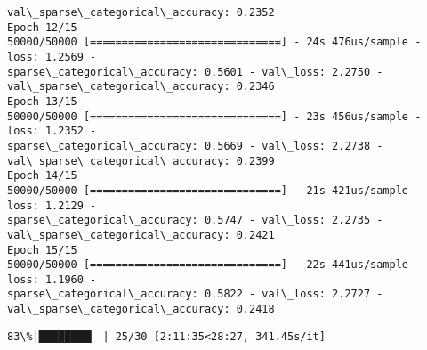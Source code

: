 \documentclass[11pt]{article}
\begin{document}
\begin{Verbatim}[commandchars=\\\{\}]
val\_sparse\_categorical\_accuracy: 0.2352
Epoch 12/15
50000/50000 [==============================] - 24s 476us/sample - loss: 1.2569 -
sparse\_categorical\_accuracy: 0.5601 - val\_loss: 2.2750 -
val\_sparse\_categorical\_accuracy: 0.2346
Epoch 13/15
50000/50000 [==============================] - 23s 456us/sample - loss: 1.2352 -
sparse\_categorical\_accuracy: 0.5669 - val\_loss: 2.2738 -
val\_sparse\_categorical\_accuracy: 0.2399
Epoch 14/15
50000/50000 [==============================] - 21s 421us/sample - loss: 1.2129 -
sparse\_categorical\_accuracy: 0.5747 - val\_loss: 2.2735 -
val\_sparse\_categorical\_accuracy: 0.2421
Epoch 15/15
50000/50000 [==============================] - 22s 441us/sample - loss: 1.1960 -
sparse\_categorical\_accuracy: 0.5822 - val\_loss: 2.2727 -
val\_sparse\_categorical\_accuracy: 0.2418
    \end{Verbatim}

    \begin{Verbatim}[commandchars=\\\{\}]
 83\%|████████▎ | 25/30 [2:11:35<28:27, 341.45s/it]
    \end{Verbatim}
\end{document}
